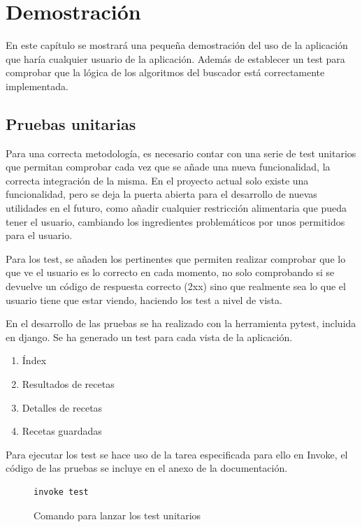 \chapter{Demostración}
En este capítulo se mostrará una pequeña demostración del uso de la aplicación que haría cualquier usuario de la aplicación. Además de establecer un test para comprobar que la lógica de los algoritmos del buscador está correctamente implementada.

\section{Pruebas unitarias}
Para una correcta metodología, es necesario contar con una serie de test unitarios que permitan comprobar cada vez que se añade una nueva funcionalidad, la correcta integración de la misma. En el proyecto actual solo existe una funcionalidad, pero se deja la puerta abierta para el desarrollo de nuevas utilidades en el futuro, como añadir cualquier restricción alimentaria que pueda tener el usuario, cambiando los ingredientes problemáticos por unos permitidos para el usuario. 

Para los test, se añaden los pertinentes que permiten realizar comprobar que lo que ve el usuario es lo correcto en cada momento, no solo comprobando si se devuelve un código de respuesta correcto (2xx) sino que realmente sea lo que el usuario tiene que estar viendo, haciendo los test a nivel de vista.

En el desarrollo de las pruebas se ha realizado con la herramienta pytest, incluida en \Gls{django}. Se ha generado un \gls{test} para cada vista de la aplicación.
\begin{enumerate}
    \item Índex
    \item Resultados de recetas
    \item Detalles de recetas
    \item Recetas guardadas
\end{enumerate}

Para ejecutar los \gls{test} se hace uso de la tarea especificada para ello en Invoke, el código de las pruebas se incluye en el anexo de la documentación. 

\begin{figure}
    \centering
    \begin{lstlisting}[style=consola]
        invoke test
    \end{lstlisting}
    \caption{Comando para lanzar los test unitarios}
    \label{sni:test}
\end{figure}

